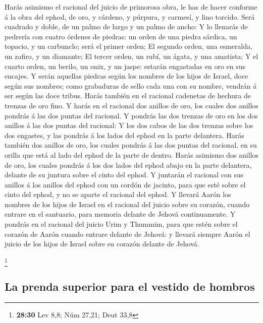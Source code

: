  Harás asimismo el racional del juicio de primorosa obra,
le has de hacer conforme á la obra del ephod, de oro, y cárdeno, y
púrpura, y carmesí, y lino torcido.  Será cuadrado y
doble, de un palmo de largo y un palmo de ancho:  Y lo
llenarás de pedrería con cuatro órdenes de piedras: un orden de una
piedra sárdica, un topacio, y un carbunclo; será el primer orden;
 El segundo orden, una esmeralda, un zafiro, y un
diamante;  El tercer orden, un rubí, un ágata, y una
amatista;  Y el cuarto orden, un berilo, un onix, y un
jaspe: estarán engastadas en oro en sus encajes.  Y serán
aquellas piedras según los nombres de los hijos de Israel, doce según
sus nombres; como grabaduras de sello cada una con su nombre, vendrán á
ser según las doce tribus.  Harás también en el racional
cadenetas de hechura de trenzas de oro fino.  Y harás en
el racional dos anillos de oro, los cuales dos anillos pondrás á las dos
puntas del racional.  Y pondrás las dos trenzas de oro en
los dos anillos á las dos puntas del racional:  Y los dos
cabos de las dos trenzas sobre los dos engastes, y las pondrás á los
lados del ephod en la parte delantera.  Harás también dos
anillos de oro, los cuales pondrás á las dos puntas del racional, en su
orilla que está al lado del ephod de la parte de dentro. 
Harás asimismo dos anillos de oro, los cuales pondrás á los dos lados
del ephod abajo en la parte delantera, delante de su juntura sobre el
cinto del ephod.  Y juntarán el racional con sus anillos
á los anillos del ephod con un cordón de jacinto, para que esté sobre el
cinto del ephod, y no se aparte el racional del ephod.  Y
llevará Aarón los nombres de los hijos de Israel en el racional del
juicio sobre su corazón, cuando entrare en el santuario, para memoria
delante de Jehová continuamente.  Y pondrás en el
racional del juicio Urim y Thummim, para que estén sobre el corazón de
Aarón cuando entrare delante de Jehová: y llevará siempre Aarón el
juicio de los hijos de Israel sobre su corazón delante de Jehová.

\footnote{\textbf{28:30} Lev 8,8; Núm 27,21; Deut 33,8}

\hypertarget{la-prenda-superior-para-el-vestido-de-hombros}{%
\subsection{La prenda superior para el vestido de
hombros}\label{la-prenda-superior-para-el-vestido-de-hombros}}

